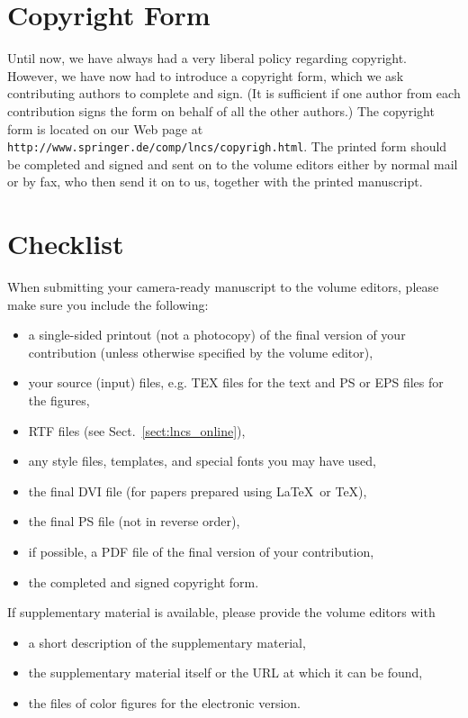 \documentclass[runningheads]{llncs}
\begin{document}
\section{Copyright Form}

Until now, we have always had a very liberal policy regarding copyright.
However, we have now had to introduce a copyright form, which we ask
contributing authors to complete and
sign. (It is sufficient if one author from each contribution signs
the form on behalf of all the other authors.)
The copyright form is
located on our Web page at
\verb+http://www.springer.de/comp/lncs/copyrigh.html+.
The printed form should be completed and signed and sent
on to the volume editors either by normal mail or by fax, who then send
it on to us, together with the printed manuscript.


\section{Checklist}

When submitting your camera-ready manuscript to the volume editors,
please make sure you include the following:
\begin{itemize}
\item a single-sided printout (not a photocopy) of the final version of
your contribution
(unless otherwise specified by the volume editor),
\item your source (input) files, e.g. TEX files for the text and PS or
EPS files for the figures,
\item RTF files (see Sect.~\ref{sect:lncs_online}),
\item any style files, templates, and special fonts you may have used,
\item the final DVI file (for papers prepared using \LaTeX\ or  \TeX),
\item the final PS file (not in reverse order),
\item if possible, a PDF file of the final version of your
contribution,
\item the completed and signed copyright form.
\end{itemize}

\noindent
If supplementary material is available, please provide the volume
editors with
\begin{itemize}
\item a short description of the supplementary material,
\item the supplementary material itself or the URL at which it can be
found,
\item the files of color figures for the electronic version.
\end{itemize}
\end{document}
